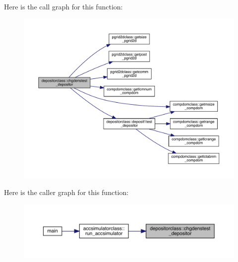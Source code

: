 Here is the call graph for this function\+:\nopagebreak
\begin{figure}[H]
\begin{center}
\leavevmode
\includegraphics[width=350pt]{namespacedepositorclass_a258e6305ffaed5752f7eaa0584e2e6d8_cgraph}
\end{center}
\end{figure}
Here is the caller graph for this function\+:\nopagebreak
\begin{figure}[H]
\begin{center}
\leavevmode
\includegraphics[width=350pt]{namespacedepositorclass_a258e6305ffaed5752f7eaa0584e2e6d8_icgraph}
\end{center}
\end{figure}
\mbox{\label{namespacedepositorclass_acb64300f2b31d40a2d4741c4475ae10a}} 
